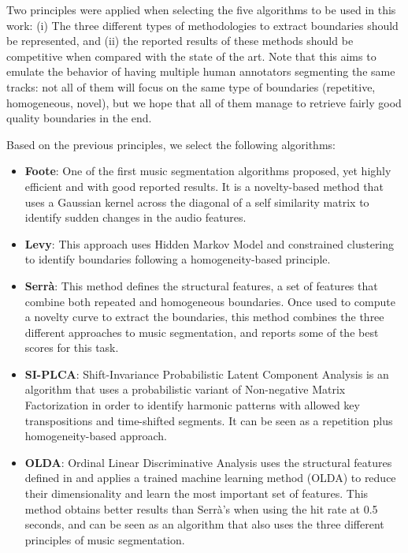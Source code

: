 \documentclass{article}
\begin{document}
Two principles were applied when selecting the five algorithms to be used in this work: (i) The three different types of methodologies to extract boundaries should be represented, and (ii) the reported results of these methods should be competitive when compared with the state of the art.
Note that this aims to emulate the behavior of having multiple human annotators segmenting the same tracks: not all of them will focus on the same type of boundaries (repetitive, homogeneous, novel), but we hope that all of them manage to retrieve fairly good quality boundaries in the end.

Based on the previous principles, we select the following algorithms:

\begin{itemize}
  \item
    \textbf{Foote}: One of the first music segmentation algorithms proposed, yet highly efficient and with good reported results\cite{Foote1999}. It is a novelty-based method that uses a Gaussian kernel across the diagonal of a self similarity matrix to identify sudden changes in the audio features.
  \item
    \textbf{Levy}: This approach uses Hidden Markov Model and constrained clustering to identify boundaries following a homogeneity-based principle\cite{Levy2008}.
  \item
    \textbf{Serr\`a}: This method defines the structural features, a set of features that combine both repeated and homogeneous boundaries. Once used to compute a novelty curve to extract the boundaries, this method combines the three different approaches to music segmentation, and reports some of the best scores for this task\cite{Serra2013}.
  \item
    \textbf{SI-PLCA}: Shift-Invariance Probabilistic Latent Component Analysis is an algorithm that uses a probabilistic variant of Non-negative Matrix Factorization in order to identify harmonic patterns with allowed key transpositions and time-shifted segments\cite{Weiss2011}. It can be seen as a repetition plus homogeneity-based approach.
  \item 
    \textbf{OLDA}: Ordinal Linear Discriminative Analysis uses the structural features defined in \cite{Serra2013} and applies a trained machine learning method (OLDA) to reduce their dimensionality and learn the most important set of features\cite{McFee2014}. This method obtains better results than Serr\`a's when using the hit rate at 0.5 seconds, and can be seen as an algorithm that also uses the three different principles of music segmentation.
\end{itemize}
\end{document}
